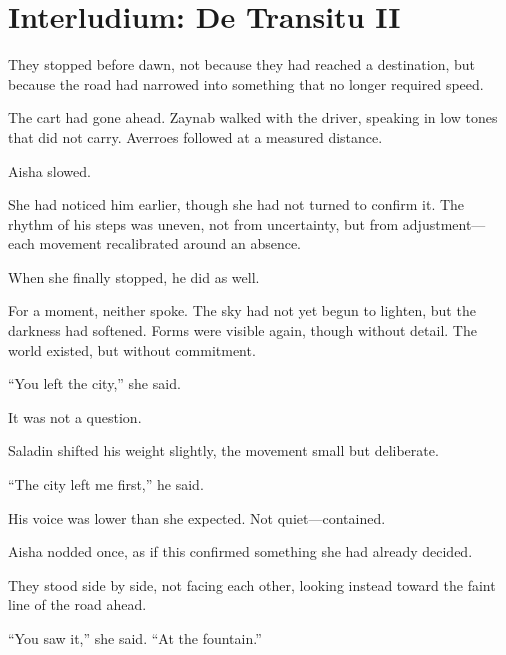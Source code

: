 
\chapter*{Interludium: De Transitu II}


They stopped before dawn, not because they had reached a destination, but because
the road had narrowed into something that no longer required speed.

The cart had gone ahead. Zaynab walked with the driver, speaking in low tones that
did not carry. Averroes followed at a measured distance.

Aisha slowed.

She had noticed him earlier, though she had not turned to confirm it. The rhythm of
his steps was uneven, not from uncertainty, but from adjustment---each movement
recalibrated around an absence.

When she finally stopped, he did as well.

For a moment, neither spoke. The sky had not yet begun to lighten, but the darkness
had softened. Forms were visible again, though without detail. The world existed,
but without commitment.

``You left the city,'' she said.

It was not a question.

Saladin shifted his weight slightly, the movement small but deliberate.

``The city left me first,'' he said.

His voice was lower than she expected. Not quiet---contained.

Aisha nodded once, as if this confirmed something she had already decided.

They stood side by side, not facing each other, looking instead toward the faint line
of the road ahead.

``You saw it,'' she said. ``At the fountain.''

